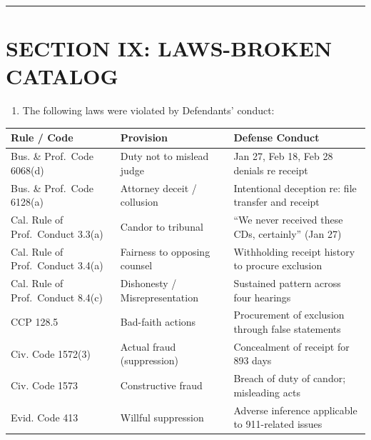 \begin{center}\rule{0.5\linewidth}{0.5pt}\end{center}

\label{toc:section-ix-lawsbroken-catalog}
\section{SECTION IX: LAWS-BROKEN CATALOG}\label{section-ix-laws-broken-catalog}

\begin{enumerate}
\def\labelenumi{\arabic{enumi}.}
\setcounter{enumi}{50}
\tightlist
\item
  The following laws were violated by Defendants' conduct:
\end{enumerate}

{\def\LTcaptype{table} %
\begin{longtable}[]{@{}
  >{\raggedright\arraybackslash}p{}
  >{\raggedright\arraybackslash}p{}
  >{\raggedright\arraybackslash}p{}@{}}
\toprule\noalign{}
\begin{minipage}[b]{\linewidth}\raggedright
Rule / Code
\end{minipage} & \begin{minipage}[b]{\linewidth}\raggedright
Provision
\end{minipage} & \begin{minipage}[b]{\linewidth}\raggedright
Defense Conduct
\end{minipage} \\
\midrule\noalign{}
\endhead
\bottomrule\noalign{}
\endlastfoot
Bus. \& Prof.~Code \textsection{} 6068(d) & Duty not to mislead judge & Jan 27, Feb 18, Feb 28 denials re receipt \\
Bus. \& Prof.~Code \textsection{} 6128(a) & Attorney deceit / collusion & Intentional deception re: file transfer and receipt \\
Cal. Rule of Prof.~Conduct 3.3(a) & Candor to tribunal & ``We never received these CDs, certainly'' (Jan 27) \\
Cal. Rule of Prof.~Conduct 3.4(a) & Fairness to opposing counsel & Withholding receipt history to procure exclusion \\
Cal. Rule of Prof.~Conduct 8.4(c) & Dishonesty / Misrepresentation & Sustained pattern across four hearings \\
CCP \textsection{} 128.5 & Bad-faith actions & Procurement of exclusion through false statements \\
Civ. Code \textsection{} 1572(3) & Actual fraud (suppression) & Concealment of receipt for 893 days \\
Civ. Code \textsection{} 1573 & Constructive fraud & Breach of duty of candor; misleading acts \\
Evid. Code \textsection{} 413 & Willful suppression & Adverse inference applicable to 911-related issues \\
\end{longtable}
}

